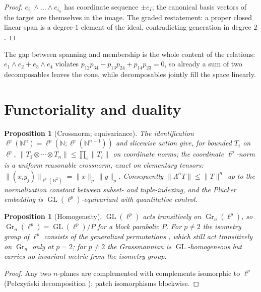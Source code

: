 \documentclass[11pt]{amsart}
\newtheorem{proposition}[theorem]{Proposition}
\theoremstyle{definition}
\newcommand{\N}{\mathbb{N}}
\newcommand{\Gr}{\operatorname{Gr}}
\newcommand{\GL}{\operatorname{GL}}
\begin{document}
\begin{proof}
$e_{i_1}\wedge\dots\wedge e_{i_n}$ has coordinate sequence $\pm e_I$; the canonical basis vectors of the target are themselves in the image. The graded restatement: a proper closed linear span is a degree-$1$ element of the ideal, contradicting generation in degree $2$ \cite[\S9]{Fulton}.
\end{proof}

The gap between spanning and membership is the whole content of the relations: $e_1\wedge e_2+e_3\wedge e_4$ violates $p_{12}p_{34}-p_{13}p_{24}+p_{14}p_{23}=0$, so already a sum of two decomposables leaves the cone, while decomposables jointly fill the space linearly.

\section{Functoriality and duality}\label{sec:funct}

\begin{proposition}[Crossnorm; equivariance]\label{prop:funct}
The identification $\ell^p(\N^n)=\ell^p(\N;\ell^p(\N^{n-1}))$ and slicewise action give, for bounded $T_i$ on $\ell^p$,
$\|T_1\otimes\cdots\otimes T_n\|\le\prod_i\|T_i\|$ on coordinate norms; the coordinate $\ell^p$-norm is a uniform reasonable crossnorm, exact on elementary tensors: $\|(x_iy_j)\|_{\ell^p(\N^2)}=\|x\|_p\,\|y\|_p$. Consequently $\|\Lambda^nT\|\le\|T\|^n$ up to the normalization constant between subset- and tuple-indexing, and the Pl\"ucker embedding is $\GL(\ell^p)$-equivariant with quantitative control.
\end{proposition}

\begin{proposition}[Homogeneity]\label{prop:homog}
$\GL(\ell^p)$ acts transitively on $\Gr_n(\ell^p)$, so $\Gr_n(\ell^p)=\GL(\ell^p)/P$ for a block parabolic $P$. For $p\ne2$ the isometry group of $\ell^p$ consists of the generalized permutations \cite{Ban,Lam}, which still act transitively on $\Gr_n$ only at $p=2$; for $p\ne 2$ the Grassmannian is $\GL$-homogeneous but carries no invariant metric from the isometry group.
\end{proposition}

\begin{proof}
Any two $n$-planes are complemented with complements isomorphic to $\ell^p$ (Pe\l czy\'nski decomposition \cite{Pel}); patch isomorphisms blockwise.
\end{proof}
\end{document}
